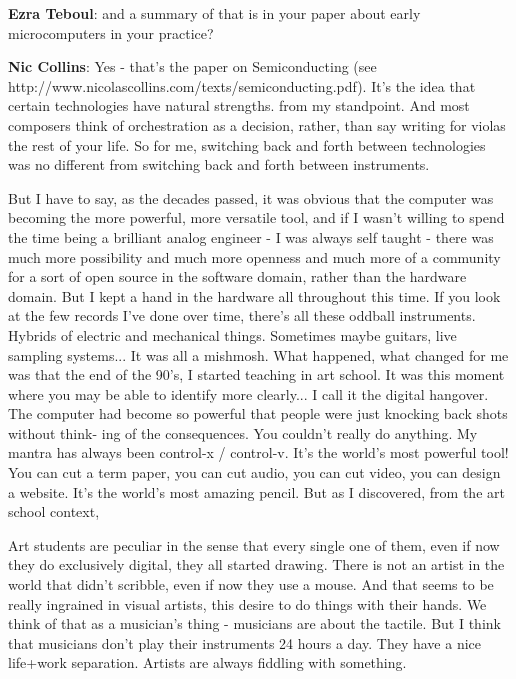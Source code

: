 \textbf{Ezra Teboul}: and a summary of that is in your paper about early microcomputers in your practice?
					
\textbf{Nic Collins}: Yes - that’s the paper on Semiconducting (see http://www.nicolascollins.com/texts/semiconducting.pdf). It’s the idea that certain technologies have natural strengths. from my standpoint. And most composers think of orchestration as a decision, rather, than say writing for violas the rest of your life. So for me, switching back and forth between technologies was no different from switching back and forth between instruments.
					
But I have to say, as the decades passed, it was obvious that the computer was becoming the more powerful, more versatile tool, and if I wasn’t willing to spend the time being a brilliant analog engineer - I was always self taught - there was much more possibility and much more openness and much more of a community for a sort of open source in the software domain, rather than the hardware domain. But I kept a hand in the hardware all throughout this time. If you look at the few records I’ve done over time, there’s all these oddball instruments. Hybrids of electric and mechanical things. Sometimes maybe guitars, live sampling systems... It was all a mishmosh. What happened, what changed for me was that the end of the 90’s, I started teaching in art school. It was this moment where you may be able to identify more clearly... I call it the digital hangover. The computer had become so powerful that people were just knocking back shots without think- ing of the consequences. You couldn’t really do anything. My mantra has always been control-x / control-v. It’s the world’s most powerful tool! You can cut a term paper, you can cut audio, you can cut video, you can design a website. It’s the world’s most amazing pencil. But as I discovered, from the art school context,
									
Art students are peculiar in the sense that every single one of them, even if now they do exclusively digital, they all started drawing. There is not an artist in the world that didn’t scribble, even if now they use a mouse. And that seems to be really ingrained in visual artists, this desire to do things with their hands. We think of that as a musician’s thing - musicians are about the tactile. But I think that musicians don’t play their instruments 24 hours a day. They have a nice life+work separation. Artists are always fiddling with something.
					
